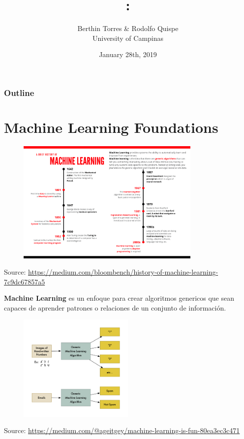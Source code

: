 \documentclass[english,svgnames,notes=hide,12pt]{beamer}
\title{\large\seminarname:\\\large\presentationtitle}
\author{Berthin Torres \& Rodolfo Quispe\\
    \small University of Campinas
}
\date{January 28th, 2019}
\begin{document}
\thispagestyle{empty}
\begin{frame}
    \titlepage
\end{frame}

\begin{frame}
    \frametitle{Outline}
    \tableofcontents
\end{frame}


\section{Machine Learning Foundations}
\begin{frame}
    \begin{figure}
        \includegraphics[width=0.8\textwidth]{imgs/machine-learning-timeline.pdf}
    \end{figure}
    \centering\tiny{Source: \url{https://medium.com/bloombench/history-of-machine-learning-7c9dc67857a5}}
\end{frame}

\begin{frame}
    \textbf{Machine Learning} es un enfoque para crear algoritmos genericos que sean capaces de aprender patrones o relaciones de un conjunto de informaci\'on.
    \vspace{-.5cm}
    \begin{figure}
        \includegraphics[width=0.5\textwidth]{imgs/sample-ml.png}
    \end{figure}
    \vspace{-.5cm}
    \centering\tiny{Source: \url{https://medium.com/@ageitgey/machine-learning-is-fun-80ea3ec3c471}}
\end{frame}
\end{document}
